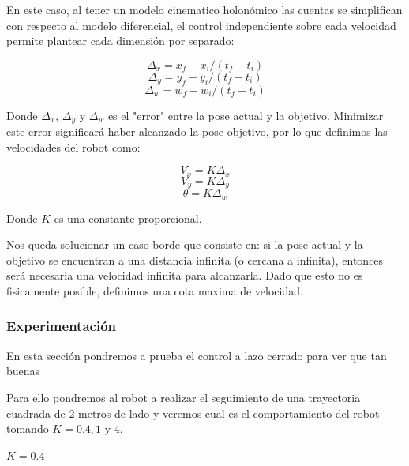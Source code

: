 En este caso, al tener un modelo cinematico holonómico las cuentas se simplifican con respecto al modelo diferencial, el control independiente sobre cada velocidad permite plantear cada  dimensión por separado:

$$\Delta_x = x_f - x_i / (t_f - t_i)$$
$$\Delta_y = y_f - y_i / (t_f - t_i)$$
$$\Delta_w = w_f - w_i / (t_f - t_i)$$

Donde $\Delta_x$, $\Delta_y$ y $\Delta_w$ es el "error" entre la pose actual y la objetivo. Minimizar este error significará haber alcanzado la pose objetivo, por lo que definimos las velocidades del robot como:

$$V_x = K \Delta_x $$
$$V_y = K \Delta_y $$
$$\theta = K \Delta_w $$

Donde $K$ es una constante proporcional.


Nos queda solucionar un caso borde que consiste en: si la pose actual y la objetivo se encuentran a una distancia infinita (o cercana a infinita), entonces será necesaria una velocidad infinita para alcanzarla. Dado que esto no es fisicamente posible, definimos una cota maxima de velocidad.


\subsubsection{Experimentación}

En esta sección pondremos a prueba el control a lazo cerrado para ver que tan buenas

Para ello pondremos al robot a realizar el seguimiento de una trayectoria cuadrada de 2 metros de lado y veremos cual es el comportamiento del robot tomando $K=0.4,1$ y $4$.

$K = 0.4$

